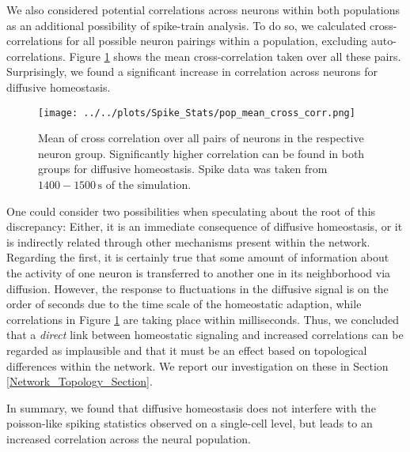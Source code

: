 \documentclass[10pt,a4paper]{article}
\begin{document}
We also considered potential correlations across neurons within both populations as an additional possibility of spike-train analysis. To do so, we calculated cross-correlations for all possible neuron pairings within a population, excluding auto-correlations. Figure \ref{Pop_Mean_Cross_Corr} shows the mean cross-correlation taken over all these pairs. Surprisingly, we found a significant increase in correlation across neurons for diffusive homeostasis. 
\begin{figure}
\texttt{[image: ../../plots/Spike\_Stats/pop\_mean\_cross\_corr.png]}
\caption{Mean of cross correlation over all pairs of neurons in the respective neuron group. Significantly higher correlation can be found in both groups for diffusive homeostasis. Spike data was taken from $\mathrm{1400-1500\,s}$ of the simulation.}
\label{Pop_Mean_Cross_Corr}
\end{figure}
One could consider two possibilities when speculating about the root of this discrepancy: Either, it is an immediate consequence of diffusive homeostasis, or it is indirectly related through other mechanisms present within the network. Regarding the first, it is certainly true that some amount of information about the activity of one neuron is transferred to another one in its neighborhood via diffusion. However, the response to fluctuations in the diffusive signal is on the order of seconds due to the time scale of the homeostatic adaption, while correlations in Figure \ref{Pop_Mean_Cross_Corr} are taking place within milliseconds. Thus, we concluded that a \emph{direct} link between homeostatic signaling and increased correlations can be regarded as implausible and that it must be an effect based on topological differences within the network. We report our investigation on these in Section \ref{Network_Topology_Section}.

In summary, we found that diffusive homeostasis does not interfere with the poisson-like spiking statistics observed on a single-cell level, but leads to an increased correlation across the neural population. 
\end{document}
